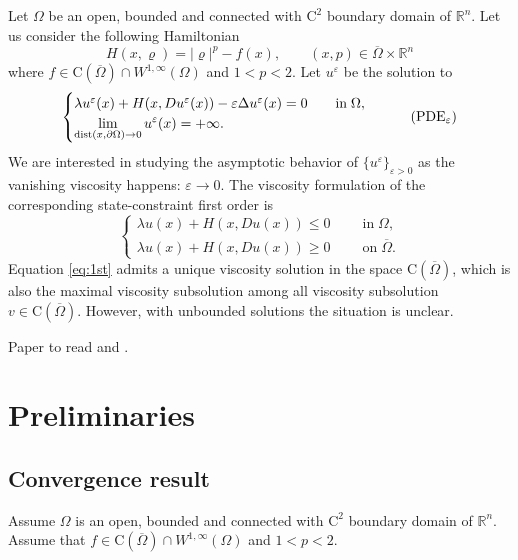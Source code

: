 \documentclass[11pt,reqno]{amsart}
\numberwithin{figure}{section}
\theoremstyle{plain}
\theoremstyle{remark}
\numberwithin{equation}{section}
\newcommand{\rmC}{\mathrm{C}}
\begin{document}
Let $\Omega$ be an open, bounded and connected with $\mathrm{C}^2$ boundary domain of $\mathbb{R}^n$. Let us consider the following Hamiltonian
\begin{equation*}
    H(x,\varrho) = |\varrho|^p-f(x), \qquad (x,p)\in \overline{\Omega}\times \mathbb{R}^n
\end{equation*}
where $f\in \mathrm{C}(\overline{\Omega})\cap W^{1,\infty}(\Omega)$ and $1<p<2$. Let $u^\varepsilon$ be the solution to 
\begin{equation}\label{eq:PDE}
    \begin{cases}
    \lambda u^\varepsilon(x) + H(x,Du^\varepsilon(x)) - \varepsilon \Delta u^\varepsilon(x) = 0 \qquad
    \text{in}\;\Omega, \vspace{0cm}\\
    \displaystyle  \lim_{\mathrm{dist}(x,\partial \Omega)\to 0} u^\varepsilon(x) = +\infty.
    \end{cases} \tag{PDE$_\varepsilon$}
\end{equation}
We are interested in studying the asymptotic behavior of $\{u^\varepsilon\}_{\varepsilon>0}$ as the vanishing viscosity happens: $\varepsilon\rightarrow 0$. The viscosity formulation of the corresponding state-constraint first order is
\begin{equation}\label{eq:1st}
    \begin{cases}
     \lambda u(x) + H(x,Du(x)) \leq 0\;\qquad\text{in}\;\Omega,\\
     \lambda u(x) + H(x,Du(x)) \geq 0\;\qquad\text{on}\;\overline{\Omega}.
    \end{cases}
\end{equation}
Equation \eqref{eq:1st} admits a unique viscosity solution in the space $\rmC(\overline{\Omega})$, which is also the maximal viscosity subsolution among all viscosity subsolution $v\in\rmC(\overline{\Omega})$. However, with unbounded solutions the situation is unclear.

Paper to read \cite{Ishii2017a} and \cite{Lasry1989}.

\section{Preliminaries}\label{sec:prelim}




\subsection{Convergence result}
Assume $\Omega$ is an open, bounded and connected with $\mathrm{C}^2$ boundary domain of $\mathbb{R}^n$. Assume that $f\in \mathrm{C}(\overline{\Omega})\cap W^{1,\infty}(\Omega)$ and $1<p<2$. \vspace{0.2cm}
\end{document}
